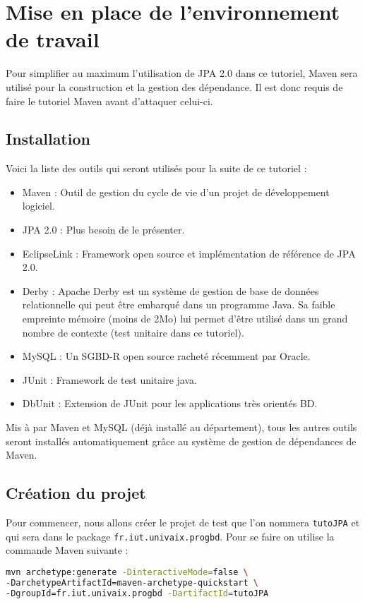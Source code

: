 \documentclass[a4paper,11pt]{article}
\begin{document}
\section{Mise en place de l'environnement de travail}
Pour simplifier au maximum l'utilisation de JPA 2.0 dans ce tutoriel, Maven sera utilisé pour la construction et la 
gestion des dépendance. Il est donc requis de faire le tutoriel Maven avant d'attaquer celui-ci.

\subsection{Installation}
Voici la liste des outils qui seront utilisés pour la suite de ce tutoriel : 
\begin{itemize}
\item Maven : Outil de gestion du cycle de vie d'un projet de développement logiciel.
\item JPA 2.0 : Plus besoin de le présenter.
\item EclipseLink : Framework open source et implémentation de référence de JPA 2.0.
\item Derby : Apache Derby est un système de gestion de base de données relationnelle qui peut être embarqué dans un programme Java. 
      Sa faible empreinte mémoire (moins de 2Mo) lui permet d'être utilisé dans un grand nombre de contexte (test unitaire 
      dans ce tutoriel).
\item MySQL : Un SGBD-R open source racheté récemment par Oracle.
\item JUnit : Framework de test unitaire java.
\item DbUnit : Extension de JUnit pour les applications très orientés BD.
\end{itemize}
Mis à par Maven et MySQL (déjà installé au département), tous les autres outils seront installés automatiquement grâce au 
système de gestion de dépendances de Maven.

\subsection{Création du projet}
Pour commencer, nous allons créer le projet de test que l'on nommera \texttt{tutoJPA} et qui sera dans le package 
\texttt{fr.iut.univaix.progbd}. Pour se faire on utilise la commande Maven suivante : 
\begin{lstlisting}[language=sh,style=customsh]
mvn archetype:generate -DinteractiveMode=false \
-DarchetypeArtifactId=maven-archetype-quickstart \
-DgroupId=fr.iut.univaix.progbd -DartifactId=tutoJPA
\end{lstlisting}
\end{document}
